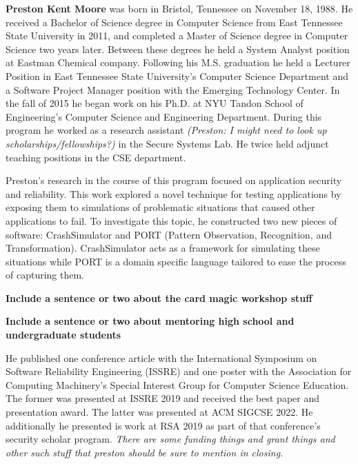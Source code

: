 

\textbf{Preston Kent Moore} was born in Bristol, Tennessee on November 18, 1988.  He received a Bachelor of Science degree in Computer Science from East Tennessee State University in 2011, and completed a Master of Science degree in Computer Science two years later. Between these degrees he held a System Analyst position at Eastman Chemical company. Following his M.S. graduation he held a Lecturer Position in East Tennessee State University's Computer Science Department and a Software Project Manager position with the Emerging Technology Center.
In the fall of 2015 he began work on his Ph.D. at NYU Tandon School of Engineering's Computer Science and Engineering Department.  During this program he worked as a research assistant \textit{(Preston: I might need to look up scholarships/fellowships?)} in the Secure Systems Lab.  He twice held adjunct teaching positions in the CSE department.

Preston's research in the course of this program focused on application security and reliability.
This work explored a novel technique for testing applications by exposing them to simulations of problematic situations that caused other applications to fail.
To investigate this topic, he constructed two new pieces of software: CrashSimulator and PORT (Pattern Observation, Recognition, and Transformation).  CrashSimulator acts as a framework for simulating these situations while PORT is a domain specific language tailored to ease the process of capturing them.

\textbf{Include a sentence or two about the card magic workshop stuff}

\textbf{Include a sentence or two about mentoring high school and undergraduate students}

He published one conference article with the International Symposium on Software Reliability Engineering (ISSRE) and one poster with the Association for Computing Machinery's Special Interest Group for Computer Science Education.  The former was presented at ISSRE 2019 and received the best paper and presentation award.  The latter was presented at ACM SIGCSE 2022.  He additionally he presented is work at RSA 2019 as part of that conference's security scholar program.  \textit{There are some funding things and grant things and other such stuff that preston should be sure to mention in closing.}


